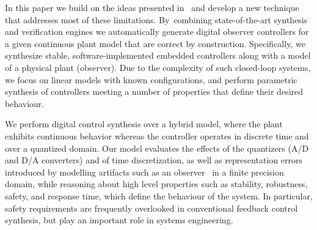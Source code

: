 \documentclass[sigconf]{llncs}
\begin{document}
In this paper we build on the ideas presented in~\cite{abate2017automated}
and develop a new technique that addresses most of these limitations. 
By~combining state-of-the-art synthesis and verification engines we
automatically generate digital observer controllers for a given continuous
plant model that are correct by construction.  %
Specifically, we synthesize stable,
software-implemented embedded controllers along with a model of a physical
plant (observer).  Due to the complexity of such closed-loop systems, we focus
on linear models with known configurations, and perform
parametric synthesis of controllers meeting a number of properties that
define their desired behaviour.

We perform digital control synthesis over a hybrid model, where the plant
exhibits continuous behavior whereas the controller operates in discrete
time and over a quantized domain.  Our model evaluates the effects of the
quantizers (A/D and D/A converters) and of time discretization, as well as
representation errors introduced by modelling artifacts such as an
observer~\cite{astrom1997computer} in a finite precision domain, while
reasoning about high level properties such as stability, robustness, safety,
and response time, which define the behaviour of the system.  In particular,
safety requirements are frequently overlooked in conventional feedback
control synthesis, but play an important role in systems engineering.

\end{document}
